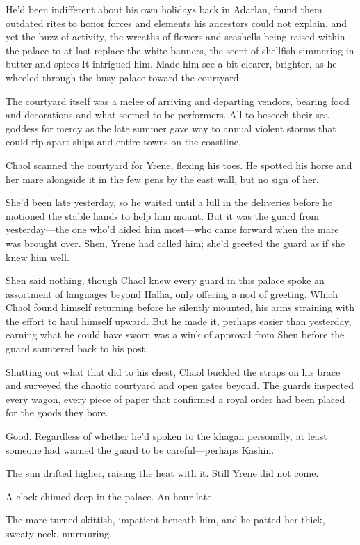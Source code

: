 He'd been indifferent about his own holidays back in Adarlan, found them outdated rites to honor forces and elements his ancestors could not explain, and yet the buzz of activity, the wreaths of flowers and seashells being raised within the palace to at last replace the white banners, the scent of shellfish simmering in butter and spices 
It intrigued him.
Made him see a bit clearer, brighter, as he wheeled through the busy palace toward the courtyard.

The courtyard itself was a melee of arriving and departing vendors, bearing food and decorations and what seemed to be performers.
All to beseech their sea goddess for mercy as the late summer gave way to annual violent storms that could rip apart ships and entire towns on the coastline.

Chaol scanned the courtyard for Yrene, flexing his toes.
He spotted his horse and her mare alongside it in the few pens by the east wall, but  no sign of her.

She'd been late yesterday, so he waited until a lull in the deliveries before he motioned the stable hands to help him mount.
But it was the guard from yesterday---the one who'd aided him most---who came forward when the mare was brought over.
Shen, Yrene had called him; she'd greeted the guard as if she knew him well.

Shen said nothing, though Chaol knew every guard in this palace spoke an assortment of languages beyond Halha, only offering a nod of greeting.
Which Chaol found himself returning before he silently mounted, his arms straining with the effort to haul himself upward.
But he made it, perhaps easier than yesterday, earning what he could have sworn was a wink of approval from Shen before the guard sauntered back to his post.

Shutting out what that did to his chest, Chaol buckled the straps on his brace and surveyed the chaotic courtyard and open gates beyond.
The guards inspected every wagon, every piece of paper that confirmed a royal order had been placed for the goods they bore.

Good.
Regardless of whether he'd spoken to the khagan personally, at least someone had warned the guard to be careful---perhaps Kashin.

The sun drifted higher, raising the heat with it.
Still Yrene did not come.

A clock chimed deep in the palace.
An hour late.

The mare turned skittish, impatient beneath him, and he patted her thick, sweaty neck, murmuring.

